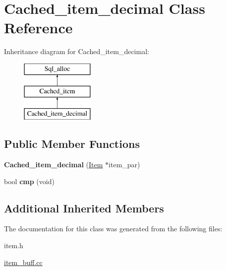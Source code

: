 \hypertarget{classCached__item__decimal}{}\section{Cached\+\_\+item\+\_\+decimal Class Reference}
\label{classCached__item__decimal}
Inheritance diagram for Cached\+\_\+item\+\_\+decimal\+:\begin{figure}[H]
\begin{center}
\leavevmode
\includegraphics[height=3.000000cm]{classCached__item__decimal}
\end{center}
\end{figure}
\subsection*{Public Member Functions}
\begin{DoxyCompactItemize}
\item 
\mbox{\label{classCached__item__decimal_aa9044efa660d85d9ea56513b36b8ee18}} 
{\bfseries Cached\+\_\+item\+\_\+decimal} (\mbox{\hyperlink{classItem}{Item}} $\ast$item\+\_\+par)
\item 
\mbox{\label{classCached__item__decimal_a94298e4cb99f598f97d8924c60607e5f}} 
bool {\bfseries cmp} (void)
\end{DoxyCompactItemize}
\subsection*{Additional Inherited Members}


The documentation for this class was generated from the following files\+:\begin{DoxyCompactItemize}
\item 
item.\+h\item 
\mbox{\hyperlink{item__buff_8cc}{item\+\_\+buff.\+cc}}\end{DoxyCompactItemize}
